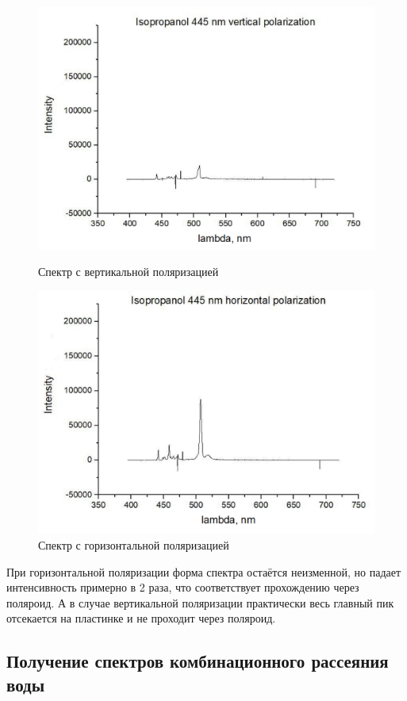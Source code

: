 \documentclass{article}
\begin{document}
\begin{figure}[h!] 
        \centering
        \centering
            \includegraphics[width=0.8\linewidth]{Images/вертикаль.png}
                 \caption{Спектр с вертикальной поляризацией}
                 \label{вертикаль}
        \endminipage\hfill
        \centering
             \includegraphics[width=0.8\linewidth]{Images/горизонталь.png}
                 \caption{Спектр с горизонтальной поляризацией}
                 \label{горизонталь}
        \endminipage
\end{figure}
\par При горизонтальной поляризации форма спектра остаётся неизменной, но падает интенсивность примерно в 2 раза, что соответствует прохождению через поляроид. А в случае вертикальной поляризации практически весь главный пик отсекается на пластинке и не проходит через поляроид.

\newpage

\subsection{Получение спектров комбинационного рассеяния воды}
\end{document}
